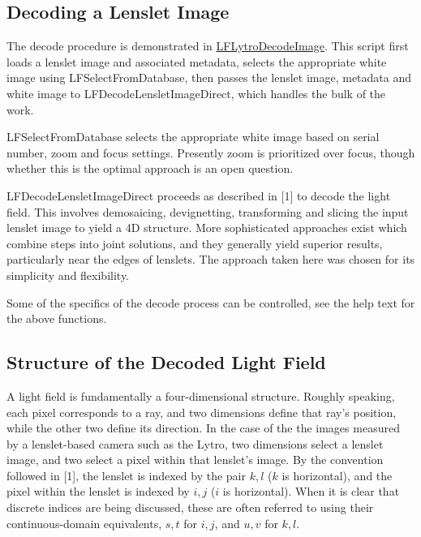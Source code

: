 \documentclass[onecolumn]{article}
\newcommand{\CiteFunc}[1]{\hyperlink{#1}{\small #1}}
\newcommand{\SupFunction}[1]{{\small #1}}
\begin{document}
\subsection{Decoding a Lenslet Image}

The decode procedure is demonstrated in \CiteFunc{LFLytroDecodeImage}. This script first loads a lenslet image and associated metadata, selects the appropriate white image using \SupFunction{LFSelectFromDatabase}, then passes the lenslet image, metadata and white image to \SupFunction{LFDecodeLensletImageDirect}, which handles the bulk of the work.

\SupFunction{LFSelectFromDatabase} selects the appropriate white image based on serial number, zoom and focus settings. Presently zoom is prioritized over focus, though whether this is the optimal approach is an open question.

\SupFunction{LFDecodeLensletImageDirect} proceeds as described in [1] to decode the light field. This involves demosaicing, devignetting, transforming and slicing the input lenslet image to yield a 4D structure. More sophisticated approaches exist which combine steps into joint solutions, and they generally yield superior results, particularly near the edges of lenslets. The approach taken here was chosen for its simplicity and flexibility.

Some of the specifics of the decode process can be controlled, see the help text for the above functions.

\subsection{Structure of the Decoded Light Field}

A light field is fundamentally a four-dimensional structure. Roughly speaking, each pixel corresponds to a ray, and two dimensions define that ray's position, while the other two define its direction. In the case of the the images measured by a lenslet-based camera such as the Lytro, two dimensions select a lenslet image, and two select a pixel within that lenslet's image. By the convention followed in [1], the lenslet is indexed by the pair $k, l$ ($k$ is horizontal), and the pixel within the lenslet is indexed by $i, j$ ($i$ is horizontal). When it is clear that discrete indices are being discussed, these are often referred to using their continuous-domain equivalents, $s,t$ for $i,j$, and $u,v$ for $k,l$.
\end{document}
